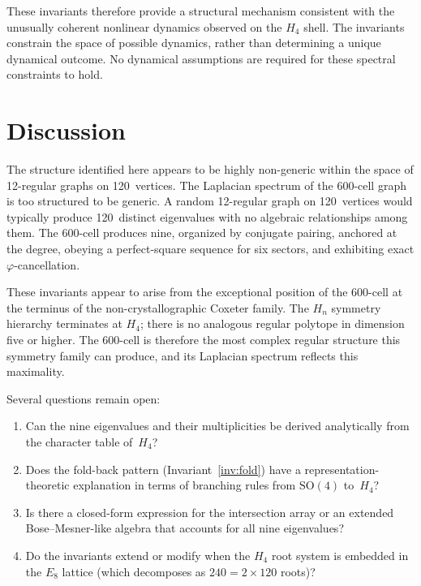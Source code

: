 \documentclass[12pt,a4paper]{article}
\newcommand{\Hfour}{H_4}
\newcommand{\Eeight}{E_8}
\newcommand{\vphi}{\varphi}
\begin{document}
These invariants therefore provide a structural mechanism consistent
with the unusually coherent nonlinear dynamics observed on the $\Hfour$
shell.  The invariants constrain the space of possible dynamics, rather
than determining a unique dynamical outcome.  No dynamical assumptions
are required for these spectral constraints to hold.


\section{Discussion}\label{sec:discussion}

The structure identified here appears to be highly non-generic within
the space of 12-regular graphs on 120~vertices.  The Laplacian spectrum of the
600-cell graph is too structured to be generic.  A random 12-regular graph on 120~vertices would typically
produce 120~distinct eigenvalues with no algebraic relationships among
them.  The 600-cell produces nine, organized by conjugate pairing,
anchored at the degree, obeying a perfect-square sequence for six
sectors, and exhibiting exact $\vphi$-cancellation.

These invariants appear to arise from the exceptional position of the
600-cell at the terminus of the non-crystallographic Coxeter family.
The $H_n$ symmetry hierarchy terminates at $\Hfour$; there is no
analogous regular polytope in dimension five or higher.  The 600-cell
is therefore the most complex regular structure this symmetry family
can produce, and its Laplacian spectrum reflects this maximality.

Several questions remain open:
\begin{enumerate}[nosep]
\item Can the nine eigenvalues and their multiplicities be derived
  analytically from the character table of~$\Hfour$?
\item Does the fold-back pattern (Invariant~\ref{inv:fold}) have a
  representation-theoretic explanation in terms of branching rules from
  $\mathrm{SO}(4)$ to~$\Hfour$?
\item Is there a closed-form expression for the intersection array or
  an extended Bose--Mesner-like algebra that accounts for all nine
  eigenvalues?
\item Do the invariants extend or modify when the $\Hfour$ root system
  is embedded in the $\Eeight$ lattice (which decomposes as
  $240 = 2 \times 120$ roots)?
\end{enumerate}
\end{document}
